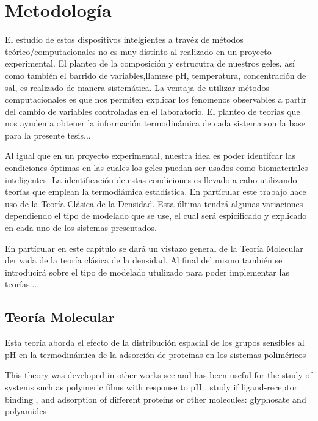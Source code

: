 \chapter{Metodolog\'ia}
\label{Metodologia}

El estudio de estos dispositivos intelgientes a trav\'ez de m\'etodos te\'orico/computacionales no es muy distinto al realizado en un proyecto experimental. El planteo de la composici\'on y estrucutra de nuestros geles, as\'i como tambi\'en el barrido de variables,llamese pH, temperatura, concentraci\'on de sal, es realizado de manera sistem\'atica.
La ventaja de utilizar m\'etodos computacionales es que nos permiten explicar los fenomenos observables a partir del cambio de variables controladas en el laboratorio.
El planteo de teor\'ias que nos ayuden a obtener la informaci\'on termodin\'amica de cada sistema son la base para la presente tesis... 


Al igual que en un proyecto experimental, nuestra idea es poder identifcar las condiciones \'optimas en las cuales los geles puedan ser usados como biomateriales inteligentes. 
La identificaci\'on de estas condiciones es llevado a cabo utilizando teor\'ias que emplean la termodi\'amica estad\'istica. En part\'icular este trabajo hace uso de la Teor\'ia Cl\'asica de la Densidad. Esta \'ultima tendr\'a algunas variaciones dependiendo el tipo de modelado que se use, el cual ser\'a espicificado y explicado en cada uno de los sistemas presentados.

En part\'icular en este cap\'itulo se dar\'a un vistazo general de la Teor\'ia Molecular derivada de la teor\'ia cl\'asica de la densidad. 
Al final del mismo tambi\'en se introducir\'a sobre el tipo de modelado utulizado para poder implementar las teor\'ias....
 

\section{Teor\'ia Molecular}


Esta teor\'ia aborda el efecto de la distribución espacial de los grupos sensibles al pH en la termodinámica de la adsorción de proteínas en los sistemas poliméricos


This theory was developed in other works see  and has been useful for the study of systems such as polymeric films with response to pH , study if ligand-receptor binding , and adsorption of different proteins  or other molecules: glyphosate and polyamides 



